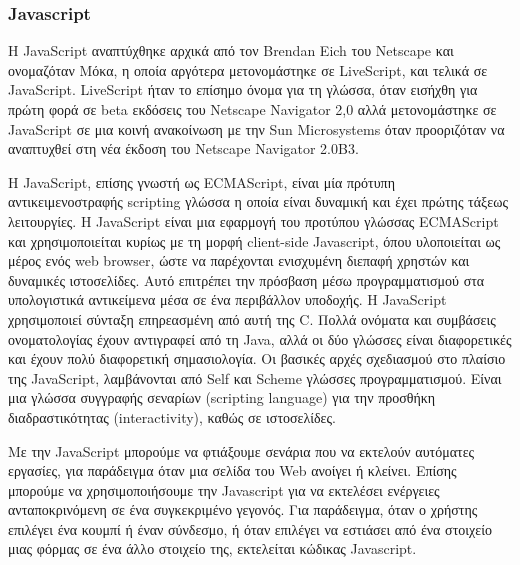 \subsubsection{Javascript}

		Η JavaScript αναπτύχθηκε αρχικά από τον Brendan Eich του Netscape και ονομαζόταν Μόκα, η οποία αργότερα μετονομάστηκε σε LiveScript, και τελικά σε JavaScript. LiveScript ήταν το επίσημο όνομα για τη γλώσσα, όταν εισήχθη για πρώτη φορά σε beta εκδόσεις του Netscape Navigator 2,0 αλλά μετονομάστηκε σε JavaScript σε μια κοινή ανακοίνωση με την Sun Microsystems όταν προοριζόταν να αναπτυχθεί στη νέα έκδοση του Netscape Navigator 2.0B3.

		H JavaScript, επίσης γνωστή ως ECMAScript, είναι μία πρότυπη αντικειμενοστραφής scripting γλώσσα η οποία είναι δυναμική και έχει πρώτης τάξεως λειτουργίες. Η JavaScript είναι μια εφαρμογή του προτύπου γλώσσας ECMAScript και χρησιμοποιείται κυρίως με τη μορφή client-side Javascript, όπου υλοποιείται ως μέρος ενός web browser, ώστε να παρέχονται ενισχυμένη διεπαφή χρηστών και δυναμικές ιστοσελίδες.
Αυτό επιτρέπει την πρόσβαση μέσω προγραμματισμού στα υπολογιστικά αντικείμενα μέσα σε ένα περιβάλλον υποδοχής. Η JavaScript χρησιμοποιεί σύνταξη επηρεασμένη από αυτή της C. Πολλά ονόματα και συμβάσεις ονοματολογίας έχουν αντιγραφεί από τη Java, αλλά οι δύο γλώσσες είναι διαφορετικές και έχουν πολύ διαφορετική σημασιολογία. Οι βασικές αρχές σχεδιασμού στο πλαίσιο της JavaScript, λαμβάνονται από Self και Scheme γλώσσες προγραμματισμού. Είναι μια γλώσσα συγγραφής σεναρίων (scripting language) για την προσθήκη διαδραστικότητας (interactivity), καθώς σε ιστοσελίδες. 

		Με την JavaScript μπορούμε να φτιάξουμε σενάρια που να εκτελούν αυτόματες εργασίες, για παράδειγμα όταν μια σελίδα του Web ανοίγει ή κλείνει. Επίσης μπορούμε να χρησιμοποιήσουμε την Javascript για να εκτελέσει ενέργειες ανταποκρινόμενη σε ένα συγκεκριμένο γεγονός. Για παράδειγμα, όταν ο χρήστης επιλέγει ένα κουμπί ή έναν σύνδεσμο, ή όταν επιλέγει να εστιάσει από ένα στοιχείο μιας φόρμας σε ένα άλλο στοιχείο της, εκτελείται κώδικας Javascript. 

